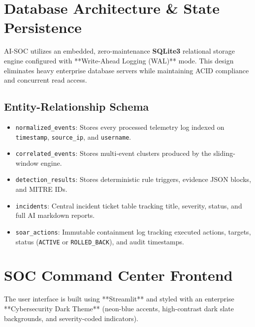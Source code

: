 \documentclass[11pt,a4paper]{article}
\begin{document}
\section{Database Architecture \& State Persistence}

AI-SOC utilizes an embedded, zero-maintenance \textbf{SQLite3} relational storage engine configured with **Write-Ahead Logging (WAL)** mode. This design eliminates heavy enterprise database servers while maintaining ACID compliance and concurrent read access.

\subsection{Entity-Relationship Schema}
\begin{itemize}
    \item \texttt{normalized\_events}: Stores every processed telemetry log indexed on \texttt{timestamp}, \texttt{source\_ip}, and \texttt{username}.
    \item \texttt{correlated\_events}: Stores multi-event clusters produced by the sliding-window engine.
    \item \texttt{detection\_results}: Stores deterministic rule triggers, evidence JSON blocks, and MITRE IDs.
    \item \texttt{incidents}: Central incident ticket table tracking title, severity, status, and full AI markdown reports.
    \item \texttt{soar\_actions}: Immutable containment log tracking executed actions, targets, status (\texttt{ACTIVE} or \texttt{ROLLED\_BACK}), and audit timestamps.
\end{itemize}

\section{SOC Command Center Frontend}

The user interface is built using **Streamlit** and styled with an enterprise **Cybersecurity Dark Theme** (neon-blue accents, high-contrast dark slate backgrounds, and severity-coded indicators).
\end{document}
